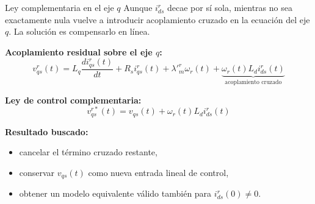 \documentclass[aspectratio=169,t]{beamer}
\begin{document}
\begin{frame}{Ley complementaria en el eje $q$}
{\small\color{uncGray}Aunque $i_{ds}^{r}$ decae por sí sola, mientras no sea exactamente nula vuelve a introducir acoplamiento cruzado en la ecuación del eje $q$. La solución es compensarlo en línea.}\par
\vspace{3mm}

\textbf{Acoplamiento residual sobre el eje $q$:}
\begin{equation*}
v_{qs}^{r}(t)=L_q\frac{di_{qs}^{r}(t)}{dt}+R_s i_{qs}^{r}(t)+\lambda'^r_m\omega_r(t)+
\underbrace{\omega_r(t)L_d i_{ds}^{r}(t)}_{\text{acoplamiento cruzado}}
\end{equation*}

\textbf{Ley de control complementaria:}
\begin{equation*}
\boxed{\;v_{qs}^{r*}(t)=v_{qs}(t)+\omega_r(t)L_d i_{ds}^{r}(t)\;}
\end{equation*}

\textbf{Resultado buscado:}
\begin{itemize}
  \item cancelar el término cruzado restante,
  \item conservar $v_{qs}(t)$ como nueva entrada lineal de control,
  \item obtener un modelo equivalente válido también para $i_{ds}^{r}(0)\neq 0$.
\end{itemize}
\end{frame}
\end{document}
